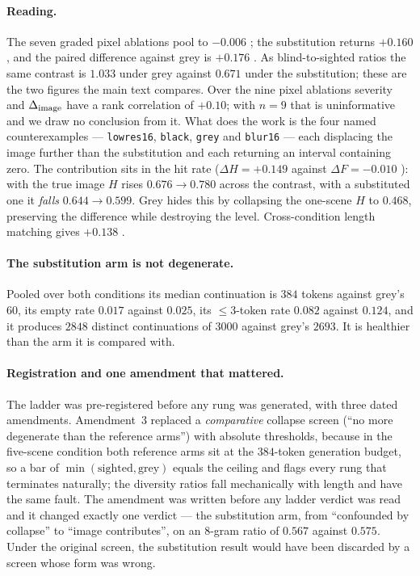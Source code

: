 \paragraph{Reading.} The seven graded pixel ablations pool to $-0.006$ ; the
substitution returns $+0.160$ , and the paired difference against grey is
$+0.176$ . As blind-to-sighted ratios the same contrast is $1.033$
 under grey against $0.671$  under the substitution; these are
the two figures the main text compares. Over the nine pixel ablations severity and $\Delta_{\mathrm{image}}$ have a rank
correlation of $+0.10$; with $n = 9$ that is uninformative and we draw no conclusion from it. What
does the work is the four named counterexamples --- \texttt{lowres16}, \texttt{black}, \texttt{grey}
and \texttt{blur16} --- each displacing the image further than the substitution and each returning
an interval containing zero. The contribution sits in the hit rate ($\Delta H = +0.149$
 against $\Delta F = -0.010$ ): with the true image $H$
rises $0.676 \to 0.780$ across the contrast, with a substituted one it \emph{falls} $0.644 \to
0.599$. Grey hides this by collapsing the one-scene $H$ to $0.468$, preserving the difference while
destroying the level. Cross-condition length matching gives $+0.138$ .

\paragraph{The substitution arm is not degenerate.} Pooled over both conditions its median
continuation is $384$ tokens against grey's $60$, its empty rate $0.017$ against $0.025$, its
$\le 3$-token rate $0.082$ against $0.124$, and it produces $2848$ distinct continuations of $3000$
against grey's $2693$. It is healthier than the arm it is compared with.

\paragraph{Registration and one amendment that mattered.} The ladder was pre-registered before any
rung was generated, with three dated amendments. Amendment~3 replaced a \emph{comparative} collapse
screen (``no more degenerate than the reference arms'') with absolute thresholds, because in the
five-scene condition both reference arms sit at the $384$-token generation budget, so a bar of
$\min(\text{sighted},\text{grey})$ equals the ceiling and flags every rung that terminates
naturally; the diversity ratios fall mechanically with length and have the same fault. The
amendment was written before any ladder verdict was read and it changed exactly one verdict --- the
substitution arm, from ``confounded by collapse'' to ``image contributes'', on an
$8$-gram ratio of $0.567$ against $0.575$. Under the original screen, the substitution result
would have been discarded by a screen whose form was wrong.

